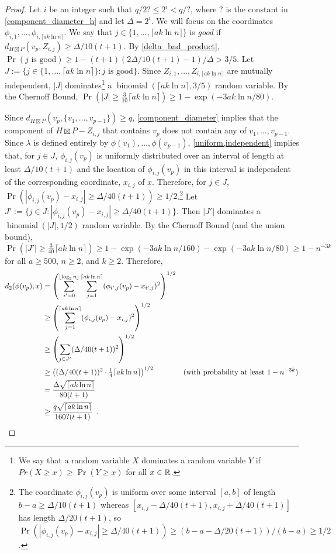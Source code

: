 \documentclass{patmorin}
\newcommand{\defin}[1]{\emph{\textcolor{brightmaroon}{#1}}}
\begin{document}
\begin{proof}
  Let $i$ be an integer such that $q/2?\le 2^i < q/?$, where $?$ is the constant in \cref{component_diameter_h} and let $\Delta=2^i$.  We will focus on the coordinates $\phi_{i,1},\ldots,\phi_{i,\lceil a k\ln n\rceil}$.  We say that $j\in\{1,\ldots,\lceil a k\ln n\rceil\}$ is \defin{good} if $d_{H\boxtimes P}(v_p,Z_{i,j})\ge \Delta/10(t+1)$.  By \cref{delta_bad_product},  $\Pr(\text{$j$ is good})\ge 1-(t+1)(2\Delta/10(t+1)-1)/\Delta > 3/5$. Let $J:=\{j\in\{1,\ldots,\lceil a k\ln n\rceil\}:\text{$j$ is good}\}$.  Since $Z_{i,1},\ldots,Z_{i,\lceil a k\ln n\rceil}$ are mutually independent, $|J|$ dominates\footnote{We say that a random variable $X$ dominates a random variable $Y$ if $Pr(X\ge x)\ge\Pr(Y\ge x)$ for all $x\in\mathbb{R}$.} a $\operatorname{binomial}(\lceil a k\ln n\rceil,3/5)$ random variable. By the Chernoff Bound, $\Pr(|J|\ge \tfrac{3}{10}\lceil a k\ln n\rceil)\ge 1-\exp(-3ak\ln n/80)$.

  Since $d_{H\boxtimes P}(v_p,\{v_1,\ldots,v_{p-1}\})\ge q$, \cref{component_diameter} implies that the component of $H\boxtimes P-Z_{i,j}$ that contains $v_p$ does not contain any of $v_1,\ldots,v_{p-1}$. Since $\lambda$ is defined entirely by $\phi(v_1),\ldots,\phi(v_{p-1})$,   \cref{uniform,independent} implies that, for $j\in J$, $\phi_{i,j}(v_p)$ is uniformly distributed over an interval of length at least $\Delta/10(t+1)$ and the location of $\phi_{i,j}(v_p)$ in this interval is independent of the corresponding coordinate, $x_{i,j}$ of $x$.
  Therefore, for $j\in J$, $\Pr(|\phi_{i,j}(v_p)-x_{i,j}|\ge \Delta/40(t+1))\ge 1/2$.\footnote{The coordinate $\phi_{i,j}(v_p)$ is uniform over some interval $[a,b]$ of length $b-a\ge \Delta/10(t+1)$ whereas $[x_{i,j}-\Delta/40(t+1),x_{i,j}+\Delta/40(t+1)]$ has length $\Delta/20(t+1)$, so $\Pr(|\phi_{i,j}(v_p)-x_{i,j}|\ge \Delta/40(t+1))\ge (b-a-\Delta/20(t+1))/(b-a)\ge 1/2$.}
  Let $J':=\{j\in J:  |\phi_{i,j}(v_p)-x_{i,j}|\ge \Delta/40(t+1)\}$.  Then $|J'|$ dominates a $\operatorname{binomial}(|J|,1/2)$ random variable.  By the Chernoff Bound (and the union bound), $\Pr(|J'|\ge \tfrac{3}{40}\lceil a k\ln n\rceil)\ge 1-\exp(-3ak\ln n/160)-\exp(-3ak\ln n/80)\ge 1-n^{-3k}$ for all $a\ge 500$, $n\ge 2$, and $k\ge 2$. Therefore,
  \begin{align*}
    d_2(\phi(v_p),x)
    & = \left(\sum_{i'=0}^{\lfloor\log_2 n\rfloor}\sum_{j=1}^{\lceil ak\ln  n\rceil}(\phi_{i',j}(v_p)-x_{i',j})^2\right)^{1/2} \\
    & \ge \left(\sum_{j=1}^{\lceil ak\ln  n\rceil}(\phi_{i,j}(v_p)-x_{i,j})^2\right)^{1/2} \\
    & \ge \left(\sum_{j\in J'}(\Delta/40(t+1))^2\right)^{1/2} \\
    & \ge \left((\Delta/40(t+1))^2\cdot \tfrac{1}{4}\lceil ak\ln  n\rceil\right)^{1/2}
      & \text{(with probability at least $1-n^{-3k}$)} \\
    & = \frac{\Delta\sqrt{\lceil ak\ln  n\rceil}}{80(t+1)} \\
    & \ge \frac{q\sqrt{\lceil ak\ln n\rceil}}{160?(t+1)} \enspace . &
    \qedhere
  \end{align*}
\end{proof}
\end{document}
